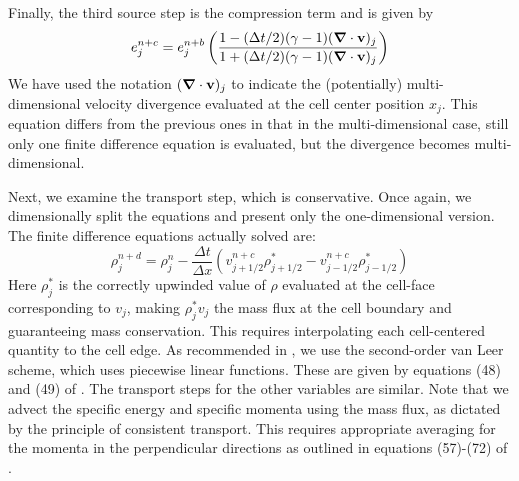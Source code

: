Finally, the third source step is the compression term and is given by
\begin{equation}
e^{n+c}_j = e^{n+b}_j \left( \frac{1 - (\Delta t/2) (\gamma - 1) (\div \vecv)_j }
                           {1 + (\Delta t/2) (\gamma - 1) (\div \vecv)_j } \right)
\end{equation}
We have used the notation $(\bm{\nabla} \cdot \mathbf{v})_j$ to indicate the (potentially) multi-dimensional velocity divergence evaluated at the cell center position $x_j$.  This equation differs from the previous ones in that in the multi-dimensional case, still only one finite difference equation is evaluated, but the divergence becomes multi-dimensional.

Next, we examine the transport step, which is conservative.  Once again, we dimensionally split the equations and present only the one-dimensional version.  The finite difference equations actually solved are:
\begin{equation}
\rho_j^{n+d} = \rho_j^{n} - \frac{\Delta t}{\Delta x} (v^{n+c}_{j+1/2} \rho^{*}_{j+1/2} - v^{n+c}_{j-1/2} \rho^{*}_{j-1/2} )
\end{equation}
Here $\rho^*_j$ is the correctly upwinded value of $\rho$ evaluated at the cell-face corresponding to $v_j$, making $\rho^*_j v_j$ the mass flux at the cell boundary and guaranteeing mass conservation.   This requires interpolating each cell-centered quantity to the cell edge.  As recommended in \citet{Stone92a}, we use the second-order van Leer scheme, which uses piecewise linear functions.  These are given by equations (48) and (49) of \citet{Stone92a}.  The transport steps for the other variables are similar.  Note that we advect the specific energy and specific momenta using the mass flux, as dictated by the principle of consistent transport.  This requires appropriate averaging for the momenta in the perpendicular directions as outlined in equations (57)-(72) of \citet{Stone92a}.


